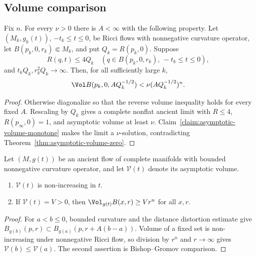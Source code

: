 \subsection{Volume comparison}

\begin{proposition}\label{prop:volume-comparison-bound}
\label{volcomp}
Fix $n$. For every $\nu>0$ there is $A<\infty$ with the following
property. Let $(M_k,g_k(t))$, $-t_k\leq t\leq0$, be Ricci flows with
nonnegative curvature operator, let
$B(p_k,0,r_k)\Subset M_k$, and put $Q_k=R(p_k,0)$. Suppose
\[
 R(q,t)\leq4Q_k
 \quad(q\in B(p_k,0,r_k),\ -t_k\leq t\leq0),
\]
and $t_kQ_k,r_k^2Q_k\to\infty$. Then, for all sufficiently large
$k$,
\[
 \Vol B(p_k,0,AQ_k^{-1/2})
 <\nu(AQ_k^{-1/2})^n.
\]
\end{proposition}
\begin{proof}
\sketch
{}
Otherwise diagonalize so that the reverse volume inequality holds
for every fixed $A$. Rescaling by $Q_k$ gives a complete nonflat
ancient limit with $R\leq4$, $R(p_\infty,0)=1$, and asymptotic
volume at least $\nu$. Claim~\ref{claim:asymptotic-volume-monotone}
makes the limit a $\nu$-solution, contradicting
Theorem~\ref{thm:asymptotic-volume-zero}.
\end{proof}

\begin{claim}\label{claim:asymptotic-volume-monotone}
Let $(M,g(t))$ be an ancient flow of complete manifolds with bounded
nonnegative curvature operator, and let $\mathcal V(t)$ denote its
asymptotic volume.
\begin{enumerate}
\item[(1)] $\mathcal V(t)$ is non-increasing in $t$.
\item[(2)] If $\mathcal V(t)=V>0$, then
$\Vol_{g(t)}B(x,r)\geq Vr^n$ for all $x,r$.
\end{enumerate}
\end{claim}
\begin{proof}
\sketch For $a<b\leq0$, bounded curvature and the distance
distortion estimate give
$B_{g(b)}(p,r)\subset B_{g(a)}(p,r+A(b-a))$. Volume of a fixed set
is non-increasing under nonnegative Ricci flow, so division by
$r^n$ and $r\to\infty$ gives
$\mathcal V(b)\leq\mathcal V(a)$. The second assertion is
Bishop--Gromov comparison.
\end{proof}

